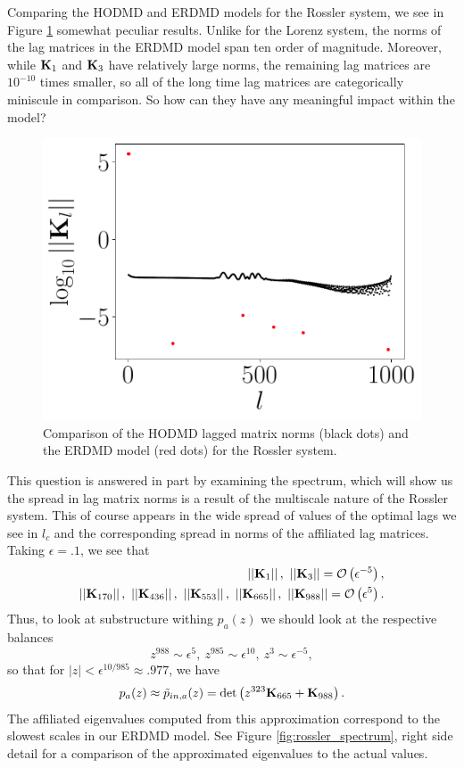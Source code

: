 \documentclass[a4paper,11pt]{article}
\newcommand{\gnorm}[1]{\left|\left|#1\right|\right|}
\begin{document}
Comparing the HODMD and ERDMD models for the Rossler system, we see in Figure \ref{fig:model_comp_d_988} somewhat peculiar results.  Unlike for the Lorenz system, the norms of the lag matrices in the ERDMD model span ten order of magnitude.  Moreover, while ${\bf K}_{1}$ and ${\bf K}_{3}$ have relatively large norms, the remaining lag matrices are $10^{-10}$ times smaller, so all of the long time lag matrices are categorically miniscule in comparison.  So how can they have any meaningful impact within the model?  
\begin{figure}[!h]
\centering
\includegraphics[width=.7\textwidth]{Rossler_norm_full_model_988}
\caption{Comparison of the HODMD lagged matrix norms (black dots) and the ERDMD model (red dots) for the Rossler system.}
\label{fig:model_comp_d_988}
\end{figure}

This question is answered in part by examining the spectrum, which will show us the spread in lag matrix norms is a result of the multiscale nature of the Rossler system.  This of course appears in the wide spread of values of the optimal lags we see in $l_{c}$ and the corresponding spread in norms of the affiliated lag matrices.  Taking $\epsilon=.1$, we see that
\begin{align}
\gnorm{{\bf K}_{1}}, ~ \gnorm{{\bf K}_{3}}=\mathcal{O}\left(\epsilon^{-5}\right),\\ 
\gnorm{{\bf K}_{170}}, ~ \gnorm{{\bf K}_{436}}, ~ \gnorm{{\bf K}_{553}}, ~ \gnorm{{\bf K}_{665}},  ~ \gnorm{{\bf K}_{988}} =\mathcal{O}\left(\epsilon^{5}\right).
\end{align}
Thus, to look at substructure withing $p_{a}(z)$ we should look at the respective balances
\begin{equation}
z^{988}\sim \epsilon^{5}, ~ z^{985}\sim \epsilon^{10}, ~ z^{3}\sim \epsilon^{-5},
\end{equation}
so that for $|z| < \epsilon^{10/985}\approx .977$, we have 
\begin{equation}
p_{a}(z) \approx \tilde{p}_{in,a}(z) = \text{det}\left(z^{323}{\bf K}_{665} + {\bf K}_{988} \right).
\end{equation}
The affiliated eigenvalues computed from this approximation correspond to the slowest scales in our ERDMD model.  See Figure \ref{fig:rossler_spectrum}, right side detail for a comparison of the approximated eigenvalues to the actual values.  
\end{document}
